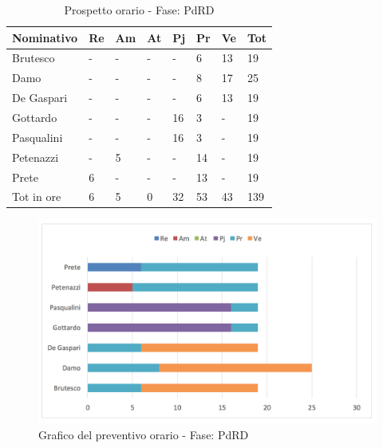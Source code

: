 							\begin{table}[H] \begin{center} \begin{tabular}{llllllll}
							\toprule
							\textbf{Nominativo}	&	\textbf{Re}	&	\textbf{Am}	&	\textbf{At}	&	\textbf{Pj}	&	\textbf{Pr}	&	\textbf{Ve}	&	\textbf{Tot}\\
							\midrule
							Brutesco	&	-	&	-	&	-	&	-	&	6	&	13	&	19	 \\
							Damo		&	-	&	-	&	-	&	-	&	8	&	17	&	25	 \\
							De Gaspari	&	-	&	-	&	-	&	-	&	6	&	13	&	19	 \\
							Gottardo	&	-	&	-	&	-	&	16	&	3	&	-	&	19	 \\
							Pasqualini	&	-	&	-	&	-	&	16	&	3	&	-	&	19	 \\
							Petenazzi	&	-	&	5	&	-	&	-	&	14	&	-	&	19	 \\
							Prete		&	6	&	-	&	-	&	-	&	13	&	-	&	19	 \\
							\midrule
							Tot in ore	&	6	&	5	&	0	&	32	&	53	&	43	&	139	 \\


							\bottomrule
							\end{tabular} \end{center} \caption{Prospetto orario - Fase:
							PdRD
							}\label{tab:h_PdRD} \end{table}		\begin{figure}[H]  \centering  \includegraphics[scale=0.42]{img/h_PdRD}
									\caption{Grafico del preventivo orario - Fase: 								PdRD	}  \label{fig:h_PdRD} \end{figure}

